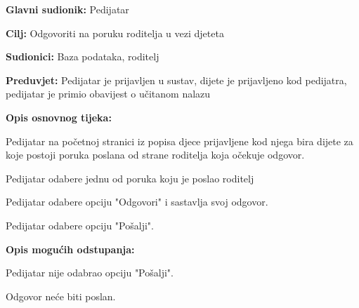 					\noindent {}
					\begin{packed_item}
						
						\item \textbf{Glavni sudionik: }Pedijatar
						\item  \textbf{Cilj:} Odgovoriti na poruku roditelja u vezi djeteta
						\item  \textbf{Sudionici:} Baza podataka, roditelj
						\item  \textbf{Preduvjet:} Pedijatar je prijavljen u sustav, dijete je prijavljeno kod pedijatra, pedijatar je primio obavijest o učitanom nalazu
						\item  \textbf{Opis osnovnog tijeka:}
						
						\item[] \begin{packed_enum}
							
							\item Pedijatar na početnoj stranici iz popisa djece prijavljene kod njega bira dijete za koje postoji poruka poslana od strane roditelja koja očekuje odgovor.
							\item Pedijatar odabere jednu od poruka koju je poslao roditelj
							\item Pedijatar odabere opciju "Odgovori" i sastavlja svoj odgovor.
							\item Pedijatar odabere opciju "Pošalji".
						\end{packed_enum}
						
						\item  \textbf{Opis mogućih odstupanja:}
						
						\item[] \begin{packed_item}
							
							\item[4.a] Pedijatar nije odabrao opciju "Pošalji".
							\item[] \begin{packed_enum}
								
								\item Odgovor neće biti poslan.
							\end{packed_enum}
							
							
						\end{packed_item}
						
						
					\end{packed_item}
					
